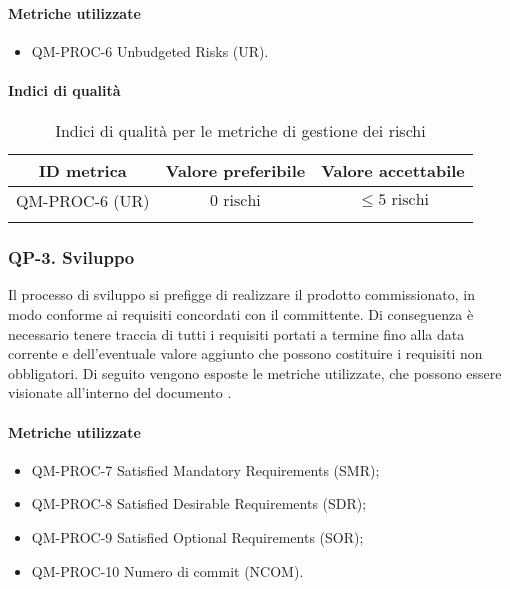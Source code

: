 		\paragraph{Metriche utilizzate}

			\begin{itemize}
				\item QM-PROC-6 Unbudgeted Risks (UR).
			\end{itemize}

		\paragraph{Indici di qualità}

			\begin{center}
				\begin{longtable}{|c|c|c|}
				\hline
				\rowcolor{lighter-grayer}
				\textbf{ID metrica} & \textbf{Valore preferibile} & \textbf{Valore accettabile}\\
				\hline
				\endfirsthead
				\hline
				QM-PROC-6 (UR) & \(0 \text{ rischi}\) & \(\le 5 \text{ rischi}\) \\
				\hline
				\caption{Indici di qualità per le metriche di gestione dei rischi}
				\end{longtable}
			\end{center}
	\newpage
	\subsubsection{QP-3. Sviluppo}

		Il processo di sviluppo si prefigge di realizzare il prodotto commissionato, in modo conforme ai requisiti concordati con il committente.
		\newline
		Di conseguenza è necessario tenere traccia di tutti i requisiti portati a termine fino alla data corrente e dell'eventuale valore aggiunto che possono costituire i requisiti non obbligatori.
		\newline
		Di seguito vengono esposte le metriche utilizzate, che possono essere visionate all'interno del documento .

		\paragraph{Metriche utilizzate}

			\begin{itemize}
				\item QM-PROC-7 Satisfied Mandatory Requirements (SMR);
				\item QM-PROC-8 Satisfied Desirable Requirements (SDR);
				\item QM-PROC-9 Satisfied Optional Requirements (SOR);
				\item QM-PROC-10 Numero di commit (NCOM).
			\end{itemize}


